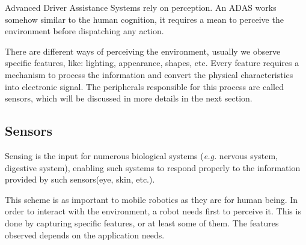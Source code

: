 Advanced Driver Assistance Systems rely on perception. An ADAS works somehow similar to the human cognition, it requires a mean to perceive the environment before dispatching any action. 

There are different ways of perceiving the environment, usually we observe specific features, like: lighting, appearance, shapes, etc. Every feature requires a mechanism to process the information and convert the physical characteristics into electronic signal. The peripherals responsible for this process are called sensors, which will be discussed in more details in the next section.


\subsection{Sensors}
\label{sec:sensors}


Sensing is the input for numerous biological systems (\textit{e.g.} nervous system, digestive system), enabling such systems to respond properly to the information provided by such sensors(eye, skin, etc.). 

This scheme is as important to mobile robotics as they are for human being. In order to interact with the environment, a robot needs first to perceive it. This is done by capturing specific features, or at least some of them. The features observed depends on the application needs.

